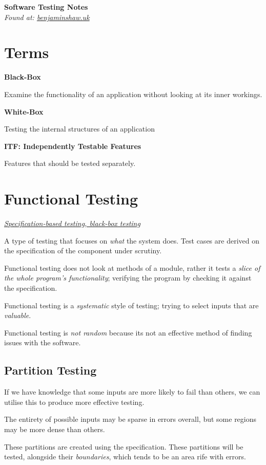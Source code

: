 \documentclass{article}
\begin{document}
\pagestyle{headings}
\textbf{\huge Software Testing Notes}\\
\textit{\footnotesize Found at: \href{http://benjaminshaw.uk}{benjaminshaw.uk}}

\section{Terms}

\textbf{Black-Box}

Examine the functionality of an application without looking at its inner workings.

\textbf{White-Box}

Testing the internal structures of an application

\textbf{ITF: Independently Testable Features}

Features that should be tested separately.

\section{Functional Testing}

\textit{\underline{Specification-based testing, black-box testing}}

A type of testing that focuses on \textit{what} the system does. Test cases are derived on the specification of the component under scrutiny.

Functional testing does not look at methods of a module, rather it tests a \textit{slice of the whole program's functionality}; verifying the program by checking it against the specification.

Functional testing is a \textit{systematic} style of testing; trying to select inputs that are \textit{valuable}.

Functional testing is \textit{not random} because its not an effective method of finding issues with the software.

\subsection{Partition Testing}

If we have knowledge that some inputs are more likely to fail than others, we can utilise this to produce more effective testing.

The entirety of possible inputs may be sparse in errors overall, but some regions may be more dense than others.

These partitions are created using the specification. These partitions will be tested, alongside their \textit{boundaries}, which tends to be an area rife with errors.
\end{document}
